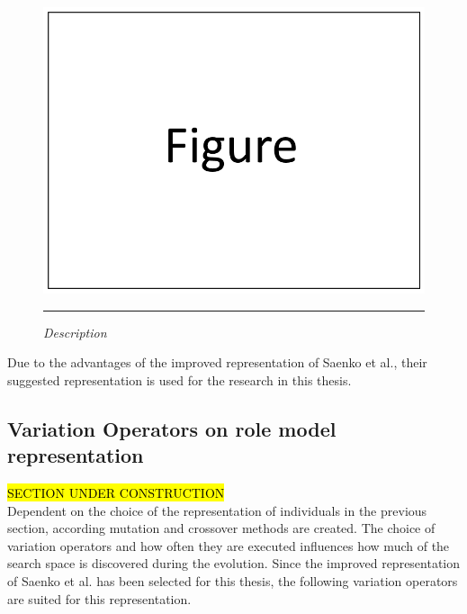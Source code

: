         \begin{figure}
            \centering
            \includegraphics[scale=0.4]{./Figures/dummy.png}
            \rule{20em}{0.5pt}
            \caption{\textit{Description}}
            \label{fig:representation3}
        \end{figure}
        Due to the advantages of the improved representation of Saenko et al.\cite{saenko2012design}, their suggested representation is used for the research in this thesis.
    
    \subsection{Variation Operators on role model representation}
    \hl{SECTION UNDER CONSTRUCTION}\\
    Dependent on the choice of the representation of individuals in the previous section, according mutation and crossover methods are created. The choice of variation operators and how often they are executed influences how much of the search space is discovered during the evolution. Since the improved representation of Saenko et al.\cite{saenko2012design} has been selected for this thesis, the following variation operators are suited for this representation.
